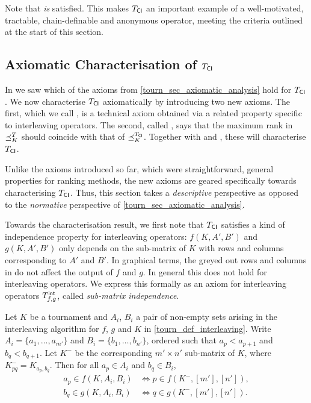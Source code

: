 Note that \anon{} \emph{is} satisfied. This makes ${T_{\mathsf{CI}}}$ an
important example of a well-motivated, tractable, chain-definable
and anonymous operator, meeting the criteria outlined at the start of
this section.

\subsection{Axiomatic Characterisation of ${T_{\mathsf{CI}}}$}

In  we saw which of the axioms from
\cref{tourn_sec_axiomatic_analysis} hold for ${T_{\mathsf{CI}}}$. We now characterise
${T_{\mathsf{CI}}}$ axiomatically by introducing two new axioms. The first, which we
call \rankremoval{}, is a technical axiom obtained via a related
property specific to interleaving operators. The second, called
\argmaxaxiom{}, says that the maximum rank in $\preceq_K^T$ should coincide
with that of $\preceq_K^{{T_{\mathsf{CI}}}}$. Together with \dualaxiom{} and
\chaindef{}, these will characterise ${T_{\mathsf{CI}}}$.

Unlike the axioms introduced so far, which were straightforward, general
properties for ranking methods, the new axioms are geared specifically towards
characterising ${T_{\mathsf{CI}}}$. Thus, this section takes a \emph{descriptive}
perspective as opposed to the \emph{normative} perspective of
\cref{tourn_sec_axiomatic_analysis}.

Towards the characterisation result, we first note that ${T_{\mathsf{CI}}}$ satisfies
a kind of independence property for interleaving operators: $f(K, A', B')$ and
$g(K, A', B')$ only depends on the sub-matrix of $K$ with rows and columns
corresponding to $A'$ and $B'$. In graphical terms, the greyed out rows and
columns in  do not affect the output of $f$ and
$g$. In general this does not hold for interleaving operators. We express this
formally as an axiom for interleaving operators ${T_{f, g}^\mathsf{int}}$, called
\emph{sub-matrix independence}.

\begin{axiom}[\smi{}]
    Let $K$ be a tournament and $A_i$, $B_i$ a pair of non-empty sets arising
    in the interleaving algorithm for $f$, $g$ and $K$ in
    \cref{tourn_def_interleaving}. Write $A_i = \{a_1, \ldots, a_{m'}\}$ and
    $B_i = \{b_1, \ldots, b_{n'}\}$, ordered such that $a_p < a_{p+1}$ and $b_q
    < b_{q+1}$. Let $K^-$ be the corresponding $m' \times n'$ sub-matrix of
    $K$, where $K^-_{pq} = K_{a_p,b_q}$. Then for all $a_p \in A_i$ and $b_q
    \in B_i$,
    \begin{align*}
        a_p \in f(K, A_i, B_i) &\iff p \in f(K^-, [m'], [n']), \\
        b_q \in g(K, A_i, B_i) &\iff q \in g(K^-, [m'], [n']).
    \end{align*}
\end{axiom}


